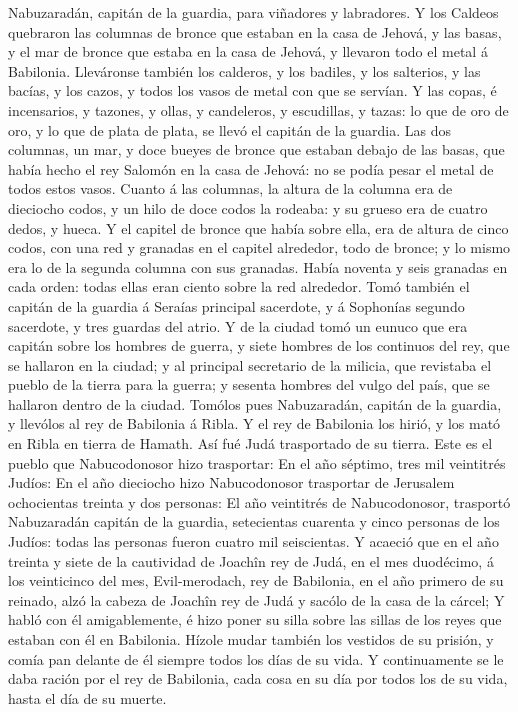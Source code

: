 Nabuzaradán, capitán de la guardia, para viñadores y labradores.
 Y los Caldeos quebraron las columnas de bronce que
estaban en la casa de Jehová, y las basas, y el mar de bronce que estaba
en la casa de Jehová, y llevaron todo el metal á Babilonia.
 Lleváronse también los calderos, y los badiles, y los
salterios, y las bacías, y los cazos, y todos los vasos de metal con que
se servían.  Y las copas, é incensarios, y tazones, y
ollas, y candeleros, y escudillas, y tazas: lo que de oro de oro, y lo
que de plata de plata, se llevó el capitán de la guardia.
 Las dos columnas, un mar, y doce bueyes de bronce que
estaban debajo de las basas, que había hecho el rey Salomón en la casa
de Jehová: no se podía pesar el metal de todos estos vasos.
 Cuanto á las columnas, la altura de la columna era de
dieciocho codos, y un hilo de doce codos la rodeaba: y su grueso era de
cuatro dedos, y hueca.  Y el capitel de bronce que había
sobre ella, era de altura de cinco codos, con una red y granadas en el
capitel alrededor, todo de bronce; y lo mismo era lo de la segunda
columna con sus granadas.  Había noventa y seis granadas
en cada orden: todas ellas eran ciento sobre la red alrededor.
 Tomó también el capitán de la guardia á Seraías
principal sacerdote, y á Sophonías segundo sacerdote, y tres guardas del
atrio.  Y de la ciudad tomó un eunuco que era capitán
sobre los hombres de guerra, y siete hombres de los continuos del rey,
que se hallaron en la ciudad; y al principal secretario de la milicia,
que revistaba el pueblo de la tierra para la guerra; y sesenta hombres
del vulgo del país, que se hallaron dentro de la ciudad. 
Tomólos pues Nabuzaradán, capitán de la guardia, y llevólos al rey de
Babilonia á Ribla.  Y el rey de Babilonia los hirió, y
los mató en Ribla en tierra de Hamath. Así fué Judá trasportado de su
tierra.  Este es el pueblo que Nabucodonosor hizo
trasportar: En el año séptimo, tres mil veintitrés Judíos:
 En el año dieciocho hizo Nabucodonosor trasportar de
Jerusalem ochocientas treinta y dos personas:  El año
veintitrés de Nabucodonosor, trasportó Nabuzaradán capitán de la
guardia, setecientas cuarenta y cinco personas de los Judíos: todas las
personas fueron cuatro mil seiscientas.  Y acaeció que en
el año treinta y siete de la cautividad de Joachîn rey de Judá, en el
mes duodécimo, á los veinticinco del mes, Evil-merodach, rey de
Babilonia, en el año primero de su reinado, alzó la cabeza de Joachîn
rey de Judá y sacólo de la casa de la cárcel;  Y habló
con él amigablemente, é hizo poner su silla sobre las sillas de los
reyes que estaban con él en Babilonia.  Hízole mudar
también los vestidos de su prisión, y comía pan delante de él siempre
todos los días de su vida.  Y continuamente se le daba
ración por el rey de Babilonia, cada cosa en su día por todos los de su
vida, hasta el día de su muerte.
